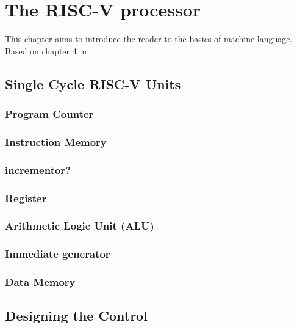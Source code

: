 \chapter{The RISC-V processor}\label{Chapter:5}

This chapter aims to introduce the reader to the basics of machine language. Based on chapter 4 in \cite{riscVbook} 

\section{Single Cycle RISC-V Units} 

    \subsection{Program Counter}
    
    \subsection{Instruction Memory}
    
    \subsection{incrementor?} 
    
    \subsection{Register}
    
    \subsection{Arithmetic Logic Unit (ALU)}
    
    \subsection{Immediate generator}
    
    \subsection{Data Memory}
    
\section{Designing the Control}
    
